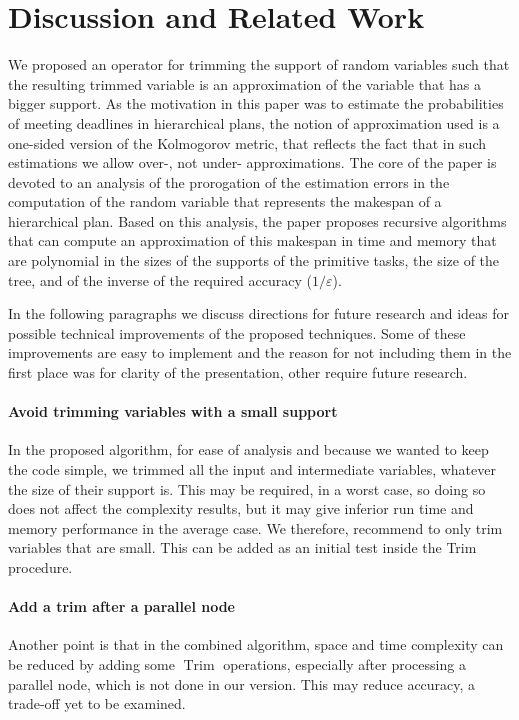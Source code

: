 \documentclass[review]{elsarticle}
\DeclareMathOperator{\Trim}{Trim}
\begin{document}
\section{Discussion and Related Work}\label{sec:discussion}

We proposed an operator for trimming the support of random variables such that the resulting trimmed variable is an approximation of the variable that has a bigger support. As the motivation in this paper was to estimate the probabilities of meeting deadlines in hierarchical plans, the notion of approximation used is a one-sided version of the Kolmogorov metric, that reflects the fact that in such estimations we allow over-, not under- approximations. The core of the paper is devoted to an analysis of the prorogation of the estimation errors in the computation of the random variable that represents the makespan of a hierarchical plan. Based on this analysis, the paper proposes recursive algorithms that can compute an approximation of this makespan in time and memory that are polynomial in the sizes of the supports of the primitive tasks, the size of the tree, and of the inverse of the required accuracy ($1/\varepsilon$).

In the following paragraphs we discuss directions for future research and ideas for possible technical improvements of the proposed techniques. Some of these improvements are easy to implement and the reason for not including them in the first place was for clarity of the presentation, other require future research.


\paragraph{\bf Avoid trimming variables with a small support} In the proposed algorithm, for ease of analysis and because we wanted to keep the code simple, we trimmed all the input and intermediate variables, whatever the size of their support is. This may be required, in a worst case, so doing so does not affect the complexity results, but it may give inferior run time and memory performance in the average case. We therefore, recommend to only trim variables that are small. This can be added as an initial test inside the Trim procedure.

\paragraph{\bf Add a trim after a parallel node} Another point is that in the combined algorithm,  space and time complexity can be reduced by adding some $\Trim$ operations,
especially after processing a parallel node, which is not done in our version. This may reduce accuracy,  a trade-off yet to be examined.
\end{document}

